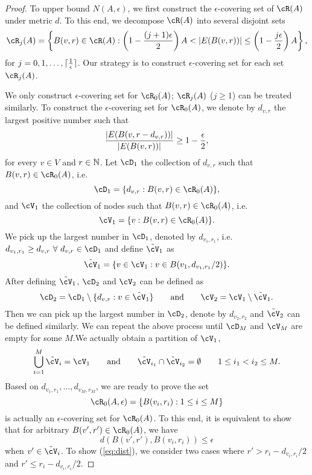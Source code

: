 \begin{proof}
	To upper bound $N(A,\epsilon)$, we first construct the $\epsilon$-covering set of $\cR(A)$ under metric $d$.
	To this end, we decompose $\cR(A)$ into several disjoint sets 
	$$
	\cR_j(A)=\left\{B(v,r)\in \cR(A): \left(1-{(j+1)\epsilon \over 2}\right)A<|E(B(v,r))|\le \left(1-{j\epsilon \over 2}\right)A\right\} ,
	$$
	for $j=0,1,\ldots, \lceil{1 \over \epsilon}\rceil$. Our strategy is to construct $\epsilon$-covering set for each set $\cR_j(A)$. 
	
	We only construct $\epsilon$-covering set for $\cR_0(A)$; $\cR_j(A)$ ($j\ge 1$) can be treated similarly.
	To construct the $\epsilon$-covering set for $\cR_0(A)$, we denote by $d_{v,r}$ the largest positive number such that
	\begin{equation}
	\label{eq:d}
	{|E(B(v,r-d_{v,r}))| \over |E(B(v,r))|}\ge 1-{\epsilon\over 2},
	\end{equation}
	for every $v\in V$ and $r\in \mathbb{N}$. Let $\cD_{1}$ the collection of $d_{v,r}$ such that $B(v,r)\in \cR_0(A)$, i.e.
	$$
	\cD_{1}=\{d_{v,r}:B(v,r)\in \cR_0(A)\},
	$$
	and $\cV_{1}$ the collection of nodes such that $B(v,r)\in \cR_0(A)$, i.e. 
	$$
	\cV_1=\{v:B(v,r)\in \cR_0(A)\}.
	$$
	We pick up the largest number in $\cD_1$, denoted by $d_{v_1,r_1}$, i.e. $
	d_{v_1,r_1}\ge d_{v,r}\ \forall\ d_{v,r}\in \cD_1$
	and define $\tilde{\cV}_{1}$  as
	$$
	\tilde{\cV}_{1}=\{v\in \cV_1:v\in B(v_1,d_{v_1,r_1}/2)\}.
	$$
	After defining $\tilde{\cV}_{1}$, $\cD_{2}$ and $\cV_2$ can be defined as
	$$
	\cD_{2}=\cD_{1}\setminus \{d_{v,r}:v\in \tilde{\cV}_{1}\}\qquad{\rm and}\qquad \cV_{2}=\cV_{1}\setminus  \tilde{\cV}_{1}.
	$$
	Then we can pick up the largest number in $\cD_{2}$, denote by $d_{v_2,r_2}$ and $\tilde{\cV}_{2}$ can be defined similarly.
	We can repeat the above process until $\cD_M$ and $\cV_M$ are empty for some $M$.We actually obtain a partition of $\cV_1$, 
	$$
	\bigcup_{i=1}^{M}\tilde{\cV}_i=\cV_1\qquad{\rm and}\qquad \tilde{\cV}_{i_1}\cap \tilde{\cV}_{i_2}=\emptyset \qquad 1\le i_1< i_2\le M.
	$$
	Based on $d_{v_1,r_1},\ldots, d_{v_M,r_M}$, we are ready to prove the set
	$$
	\cR_0(A,\epsilon)=\{B(v_i,r_i):1\le i\le M\}
	$$
	is actually an $\epsilon$-covering set for $\cR_0(A)$. To this end, it is equivalent to show that for arbitrary $B(v',r')\in \cR_0(A)$, we have
	\begin{equation}
	\label{eq:dist}
	d(B(v',r'),B(v_i,r_i))\le \epsilon
	\end{equation}
	when $v'\in \tilde{\cV}_i$. To show (\ref{eq:dist}), we consider two cases where $r'>r_i-d_{v_i,r_i}/2$ and $r'\le r_i-d_{v_i,r_i}/2$.

\end{proof}
